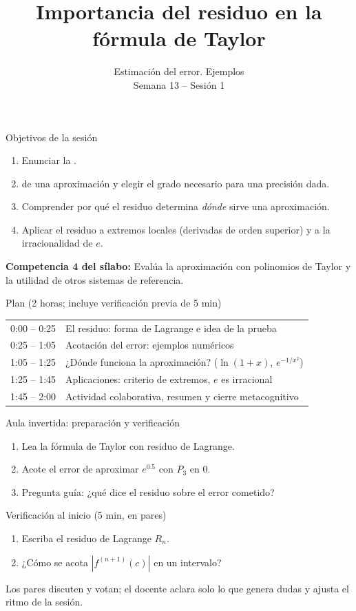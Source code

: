 \documentclass[10pt,aspectratio=169]{beamer}
\title[El residuo de Taylor]{Importancia del residuo en la fórmula de Taylor}
\subtitle{Estimación del error. Ejemplos\\[2pt]\small Semana 13 -- Sesión 1}
\begin{document}
\begin{frame}
  \titlepage
\end{frame}

\begin{frame}{Objetivos de la sesión}
  \begin{enumerate}
    \item Enunciar la .
    \item {} de una aproximación y elegir el grado necesario para una precisión dada.
    \item Comprender por qué el residuo determina \emph{dónde} sirve una aproximación.
    \item Aplicar el residuo a extremos locales (derivadas de orden superior) y a la irracionalidad de $e$.
  \end{enumerate}
  \vspace{1mm}
  {\small\textbf{Competencia 4 del sílabo:} Evalúa la aproximación con polinomios de Taylor y la utilidad de otros sistemas de referencia.}
  \begin{block}{Plan (2 horas; incluye verificación previa de 5 min)}
    \begin{tabular}{ll}
      0:00 -- 0:25 & El residuo: forma de Lagrange e idea de la prueba\\
      0:25 -- 1:05 & Acotación del error: ejemplos numéricos\\
      1:05 -- 1:25 & ¿Dónde funciona la aproximación? ($\ln(1+x)$, $e^{-1/x^2}$)\\
      1:25 -- 1:45 & Aplicaciones: criterio de extremos, $e$ es irracional\\
      1:45 -- 2:00 & Actividad colaborativa, resumen y cierre metacognitivo
    \end{tabular}
  \end{block}
\end{frame}

\begin{frame}{Aula invertida: preparación y verificación}
  \small
  \begin{previa}
    \begin{enumerate}
      \item Lea la fórmula de Taylor con residuo de Lagrange.
      \item Acote el error de aproximar $e^{0.5}$ con $P_3$ en $0$.
      \item Pregunta guía: ¿qué dice el residuo sobre el error cometido?
    \end{enumerate}
  \end{previa}
  \begin{block}{Verificación al inicio (5 min, en pares)}
    \begin{enumerate}
      \item Escriba el residuo de Lagrange $R_n$.
      \item ¿Cómo se acota $|f^{(n+1)}(c)|$ en un intervalo?
    \end{enumerate}
    Los pares discuten y votan; el docente aclara solo lo que genera dudas y ajusta el ritmo de la sesión.
  \end{block}
\end{frame}
\end{document}
